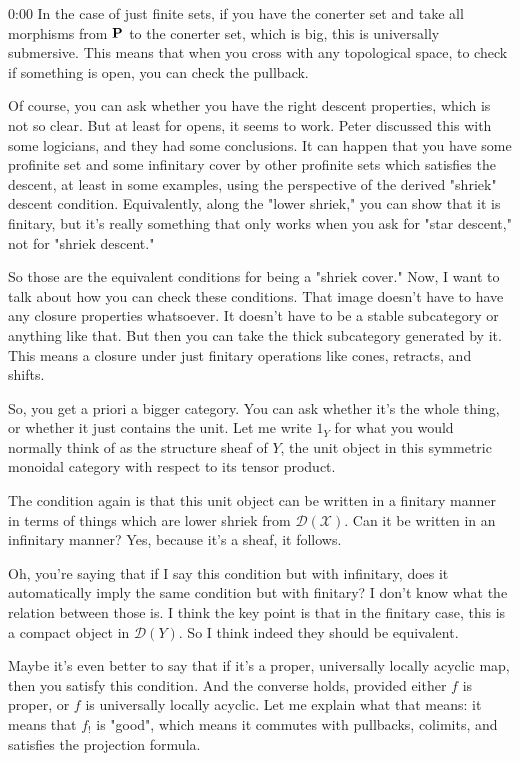 \begin{unfinished}{0:00}
In the case of just finite sets, if you have the conerter set and take all morphisms from $\P$ to the conerter set, which is big, this is universally submersive. This means that when you cross with any topological space, to check if something is open, you can check the pullback.

Of course, you can ask whether you have the right descent properties, which is not so clear. But at least for opens, it seems to work. Peter discussed this with some logicians, and they had some conclusions. It can happen that you have some profinite set and some infinitary cover by other profinite sets which satisfies the descent, at least in some examples, using the perspective of the derived "shriek" descent condition. Equivalently, along the "lower shriek," you can show that it is finitary, but it's really something that only works when you ask for "star descent," not for "shriek descent."

So those are the equivalent conditions for being a "shriek cover." Now, I want to talk about how you can check these conditions.
That image doesn't have to have any closure properties whatsoever. It doesn't have to be a stable subcategory or anything like that. But then you can take the thick subcategory generated by it. This means a closure under just finitary operations like cones, retracts, and shifts.

So, you get a priori a bigger category. You can ask whether it's the whole thing, or whether it just contains the unit. Let me write $1_Y$ for what you would normally think of as the structure sheaf of $Y$, the unit object in this symmetric monoidal category with respect to its tensor product.

The condition again is that this unit object can be written in a finitary manner in terms of things which are lower shriek from $\mathcal{D}(\mathcal{X})$. Can it be written in an infinitary manner? Yes, because it's a sheaf, it follows.

Oh, you're saying that if I say this condition but with infinitary, does it automatically imply the same condition but with finitary? I don't know what the relation between those is. I think the key point is that in the finitary case, this is a compact object in $\mathcal{D}(Y)$. So I think indeed they should be equivalent.

Maybe it's even better to say that if it's a proper, universally locally acyclic map, then you satisfy this condition. And the converse holds, provided either $f$ is proper, or $f$ is universally locally acyclic. Let me explain what that means: it means that $f_!$ is "good", which means it commutes with pullbacks, colimits, and satisfies the projection formula.


\end{unfinished}
